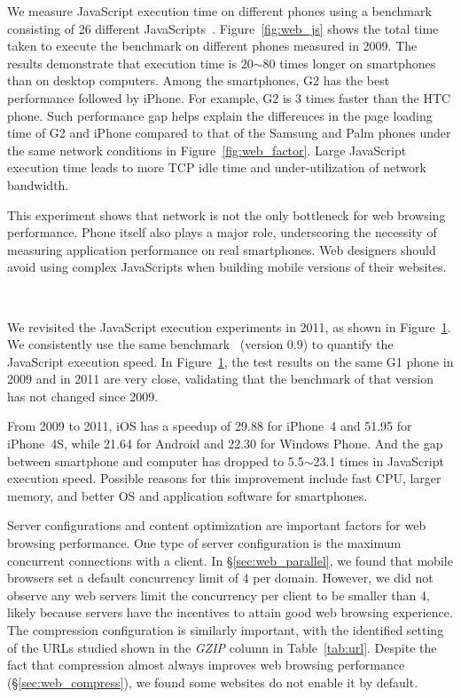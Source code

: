 We measure JavaScript execution time on different phones using a
benchmark consisting of 26 different JavaScripts~\cite{sunspider}.
Figure~\ref{fig:web_js} shows the total time taken to execute 
the benchmark on different phones measured in 2009. The results demonstrate that
execution time is 20$\sim$80 times longer on smartphones than on desktop
computers. Among the smartphones, G2 has the best performance 
followed by iPhone. For example, G2 is 3 times faster than the HTC
phone. Such performance gap helps explain the differences in the
page loading time of G2 and iPhone compared to that of the Samsung 
and Palm phones under the same network conditions in 
Figure~\ref{fig:web_factor}. Large JavaScript execution time leads 
to more TCP idle time and under-utilization of network bandwidth.

This experiment shows that network is not the only bottleneck for 
web browsing performance. Phone itself also plays a major role, 
underscoring the necessity of measuring application performance
on real smartphones. Web designers should avoid using complex
JavaScripts when building mobile versions of their websites. 

\begin{figure}[t]
\centering
{} \\
\label{fig:js}
\end{figure}

We revisited the JavaScript execution experiments in 2011, as shown in Figure~\ref{fig:js}. We consistently use the same benchmark~\cite{sunspider} (version 0.9) to quantify the JavaScript execution speed. In Figure~\ref{fig:js}, the test results on the same G1 phone in 2009 and in 2011 are very close, validating that the benchmark of that version has not changed since 2009.

From 2009 to 2011, iOS has a speedup of 29.88 for iPhone~4 and 51.95 for iPhone~4S, while 21.64 for Android and 22.30 for Windows Phone. And the gap between smartphone and computer has dropped to 5.5$\sim$23.1 times in JavaScript execution speed. Possible reasons for this improvement include fast CPU, larger memory, and better OS and application software for smartphones.


\label{sec:web_server}

Server configurations and content optimization are important factors 
for web browsing performance. One type of server configuration is 
the maximum concurrent connections with a client. In 
\S\ref{sec:web_parallel}, we found that mobile browsers set a
default concurrency limit of 4 per domain. However, we did not observe 
any web servers limit the concurrency per client to be smaller than 4, 
likely because servers have the incentives to attain good web browsing 
experience. The compression configuration is similarly important, with 
the identified setting of the URLs studied shown in the {\em GZIP} 
column in Table~\ref{tab:url}. Despite the fact that compression almost 
always improves web browsing performance (\S\ref{sec:web_compress}), 
we found some websites do not enable it by default.

